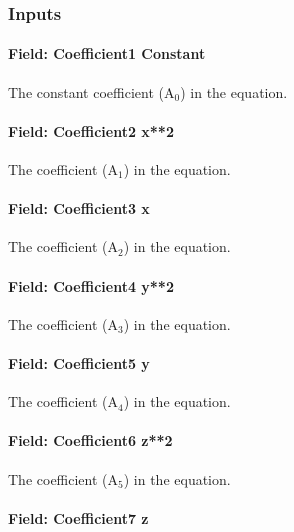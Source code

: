 \subsubsection{Inputs}\label{inputs-10-011}

\paragraph{Field: Coefficient1 Constant}\label{field-coefficient1-constant-10}

The constant coefficient (A\(_{0}\)) in the equation.

\paragraph{Field: Coefficient2 x**2}\label{field-coefficient2-x2}

The coefficient (A\(_{1}\)) in the equation.

\paragraph{Field: Coefficient3 x}\label{field-coefficient3-x-1}

The coefficient (A\(_{2}\)) in the equation.

\paragraph{Field: Coefficient4 y**2}\label{field-coefficient4-y2}

The coefficient (A\(_{3}\)) in the equation.

\paragraph{Field: Coefficient5 y}\label{field-coefficient5-y-1}

The coefficient (A\(_{4}\)) in the equation.

\paragraph{Field: Coefficient6 z**2}\label{field-coefficient6-z2}

The coefficient (A\(_{5}\)) in the equation.

\paragraph{Field: Coefficient7 z}\label{field-coefficient7-z}

